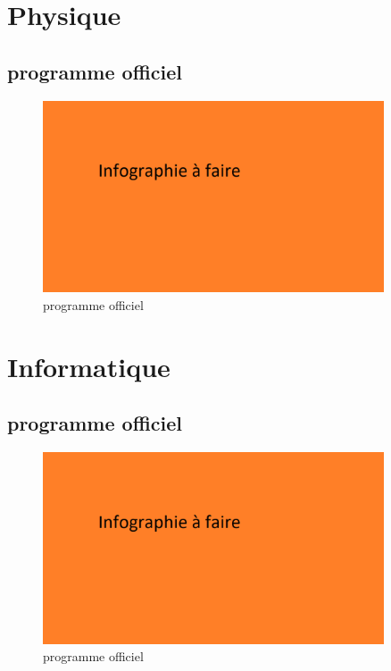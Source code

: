 \documentclass[aspectratio=169]{beamer}
\begin{document}
\section{Physique}

\subsection{programme officiel}

\begin{frame}
    \begin{figure}
        \centering
        \includegraphics[width=0.9\textwidth]{ressource_diapo/place older.png}
        \caption{programme officiel}
    \end{figure}
\end{frame}

\section{Informatique}

\subsection{programme officiel}

\begin{frame}
    \begin{figure}
        \centering
        \includegraphics[width=0.9\textwidth]{ressource_diapo/place older.png}
        \caption{programme officiel}
    \end{figure}
\end{frame}
\end{document}
